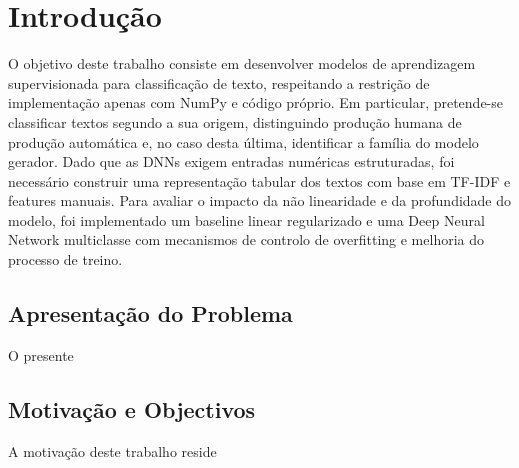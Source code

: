 \documentclass[a4paper,12pt]{scrreprt}
\begin{document}
\tableofcontents

\pagebreak

\listoffigures

\pagebreak

\listoftables

\pagebreak





\chapter{Introdução}
    O objetivo deste trabalho consiste em desenvolver modelos de aprendizagem supervisionada para classificação de texto, respeitando a restrição de implementação apenas com NumPy e código próprio. Em particular, pretende-se classificar textos segundo a sua origem, distinguindo produção humana de produção automática e, no caso desta última, identificar a família do modelo gerador. Dado que as DNNs exigem entradas numéricas estruturadas, foi necessário construir uma representação tabular dos textos com base em TF-IDF e features manuais. Para avaliar o impacto da não linearidade e da profundidade do modelo, foi implementado um baseline linear regularizado e uma Deep Neural Network multiclasse com mecanismos de controlo de overfitting e melhoria do processo de treino.

    \section{Apresentação do Problema}
        O presente 
    \section{Motivação e Objectivos}
        A motivação deste trabalho reside 


\end{document}

